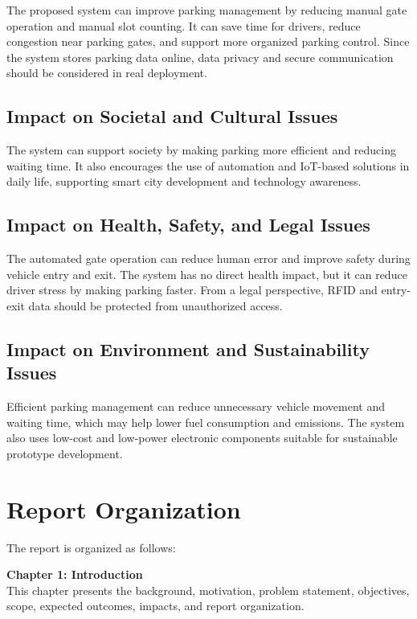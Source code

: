 The proposed system can improve parking management by reducing manual gate operation and manual slot counting. It can save time for drivers, reduce congestion near parking gates, and support more organized parking control. Since the system stores parking data online, data privacy and secure communication should be considered in real deployment.

\subsection{Impact on Societal and Cultural Issues}

The system can support society by making parking more efficient and reducing waiting time. It also encourages the use of automation and IoT-based solutions in daily life, supporting smart city development and technology awareness.

\subsection{Impact on Health, Safety, and Legal Issues}

The automated gate operation can reduce human error and improve safety during vehicle entry and exit. The system has no direct health impact, but it can reduce driver stress by making parking faster. From a legal perspective, RFID and entry-exit data should be protected from unauthorized access.

\subsection{Impact on Environment and Sustainability Issues}

Efficient parking management can reduce unnecessary vehicle movement and waiting time, which may help lower fuel consumption and emissions. The system also uses low-cost and low-power electronic components suitable for sustainable prototype development.

\section{Report Organization}

The report is organized as follows:

\textbf{Chapter 1: Introduction}\\
This chapter presents the background, motivation, problem statement, objectives, scope, expected outcomes, impacts, and report organization.

